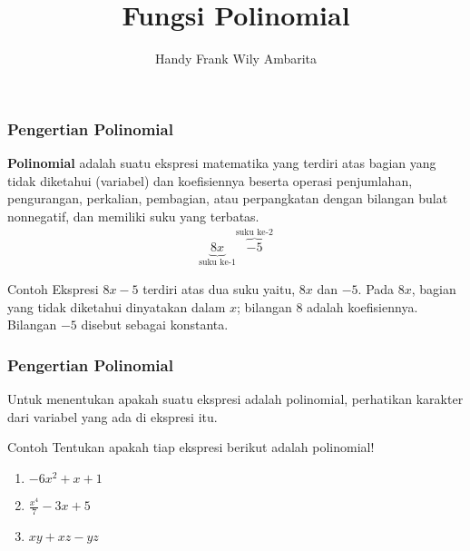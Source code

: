 \documentclass[11pt]{beamer}
\begin{document}
	\author{Handy Frank Wily Ambarita}
	\title{Fungsi Polinomial}
	
	
	\begin{frame}[plain]
		\maketitle
		\tableofcontents
	\end{frame}
	
	
	\begin{frame}
		\frametitle{Pengertian Polinomial}
		\textbf{Polinomial} adalah suatu ekspresi matematika yang terdiri atas bagian yang tidak diketahui (variabel) dan koefisiennya beserta operasi penjumlahan, pengurangan, perkalian, pembagian, atau perpangkatan dengan bilangan bulat nonnegatif, dan memiliki suku yang terbatas.
		\begin{align*}
			\underbrace{8x}_\text{suku ke-1}\overbrace{-5}^\text{suku ke-2}
		\end{align*}
		\begin{exampleblock}{Contoh}
				Ekspresi $8x-5$ terdiri atas dua suku yaitu, $8x$ dan $-5$. Pada $8x$, bagian yang tidak diketahui dinyatakan dalam $x$; bilangan $8$ adalah koefisiennya. Bilangan $-5$ disebut sebagai konstanta.
		\end{exampleblock}
		
	\end{frame}
	
	\begin{frame}
		\frametitle{Pengertian Polinomial}
		Untuk menentukan apakah suatu ekspresi adalah polinomial, perhatikan karakter dari variabel yang ada di ekspresi itu.
				
		\begin{exampleblock}{Contoh}
			Tentukan apakah tiap ekspresi berikut adalah polinomial!
			\begin{enumerate}
				\item $-6x^2+x+1$
				\item $\frac{x^4}{7}-3x+5$
				\item $xy+xz-yz$
			\end{enumerate}
		\end{exampleblock}
				
	
	\end{frame}
	
\end{document}
